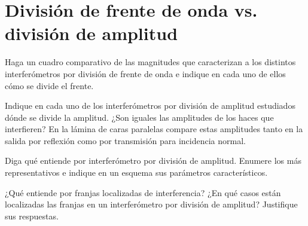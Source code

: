 \section*{División de frente de onda vs. división de amplitud}

\item Haga un cuadro comparativo de las magnitudes que caracterizan a los distintos interferómetros por división de frente de onda e indique en cada uno de ellos cómo se divide el frente. 


\item Indique en cada uno de los interferómetros por división de amplitud estudiados dónde se divide la amplitud.
¿Son iguales las amplitudes de los haces que interfieren? En la lámina de caras paralelas compare estas amplitudes tanto en la salida por reflexión como por transmisión para incidencia normal.


\item Diga qué entiende por interferómetro por división de amplitud.
Enumere los más representativos e indique en un esquema sus parámetros característicos. 


\item ¿Qué entiende por franjas localizadas de interferencia?
¿En qué casos están localizadas las franjas en un interferómetro por división de amplitud?
Justifique sus respuestas. 
